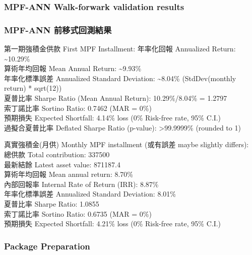 \documentclass[
]{article}
\begin{document}
\hypertarget{mpf-ann-walk-forwark-validation-results}{%
\subsubsection{MPF-ANN Walk-forwark validation
results}\label{mpf-ann-walk-forwark-validation-results}}

\hypertarget{mpf-ann-ux524dux79fbux5f0fux56deux6e2cux7d50ux679c}{%
\subsubsection{MPF-ANN
前移式回測結果}\label{mpf-ann-ux524dux79fbux5f0fux56deux6e2cux7d50ux679c}}

第一期強積金供款 First MPF Installment: 年率化回報 Annualized Return:
\textasciitilde10.29\%\\
算術年均回報 Mean Annual Return: \textasciitilde9.93\%\\
年率化標準誤差 Annualized Standard Deviation: \textasciitilde8.04\%
(StdDev(monthly return) * sqrt(12))\\
夏普比率 Sharpe Ratio (Mean Annual Return): 10.29\%/8.04\% = 1.2797\\
索丁諾比率 Sortino Ratio: 0.7462 (MAR = 0\%)\\
預期損失 Expected Shortfall: 4.14\% loss (0\% Risk-free rate, 95\%
C.I.)\\
過擬合夏普比率 Deflated Sharpe Ratio (p-value): \textgreater99.9999\%
(rounded to 1)

真實強積金(月供) Monthly MPF installment (或有誤差 maybe slightly
differs):\\
總供款 Total contribution: 337500\\
最新結餘 Latest asset value: 871187.4\\
算術年均回報 Mean annual return: 8.70\%\\
內部回報率 Internal Rate of Return (IRR): 8.87\%\\
年率化標準誤差 Annualized Standard Deviation: 8.01\%\\
夏普比率 Sharpe Ratio: 1.0855\\
索丁諾比率 Sortino Ratio: 0.6735 (MAR = 0\%)\\
預期損失 Expected Shortfall: 4.21\% loss (0\% Risk-free rate, 95\% C.I.)

\hypertarget{package-preparation}{%
\subsubsection{Package Preparation}\label{package-preparation}}
\end{document}
